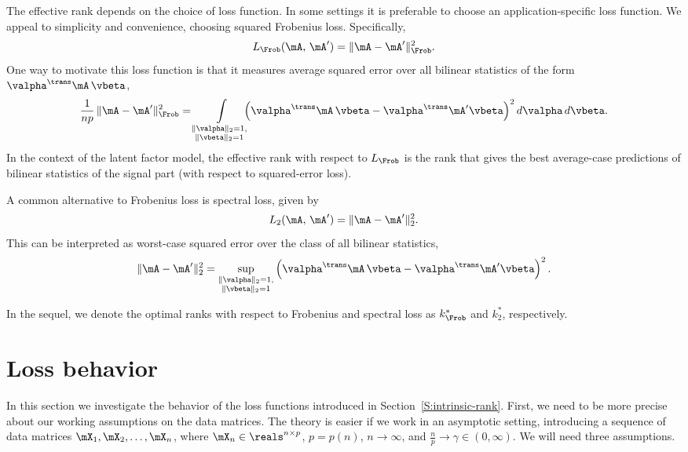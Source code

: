 The effective rank depends on the choice of loss function.  In some settings it is preferable to choose an application-specific loss function.  We appeal to simplicity and convenience, choosing squared Frobenius loss.  Specifically,
\[
    L_\Frob ( \mA, \, \mA' )
        = \| \mA - \mA' \|_\Frob^2.
\]
One way to motivate this loss function is that it measures average squared error over all bilinear statistics of the form 
$\valpha^\trans \mA \, \vbeta$,
\[
    \frac{1}{np} \,
    \| \mA - \mA' \|_\Frob^2
    =
    \int\limits_{ \substack{ \| \valpha \|_2 = 1, \\
                             \| \vbeta \|_2  = 1 } }
        \!\!\!\!
        \left(
            \valpha^\trans \mA \, \vbeta
            -
            \valpha^\trans \mA' \vbeta
        \right)^2
        d\valpha \,
        d\vbeta.
\]
In the context of the latent factor model, the effective rank with respect
to $L_\Frob$ is the rank that gives the best average-case predictions of 
bilinear statistics of the signal part (with respect to squared-error loss). 

A common alternative to Frobenius loss is spectral loss, given by
\[
    L_2 ( \mA, \, \mA' )
        = \| \mA - \mA' \|_2^2.
\]
This can be interpreted as worst-case squared error over the class of all 
bilinear statistics,
\[
    \| \mA - \mA' \|_2^2
        =
            \sup_{ \substack{ \| \valpha \|_2 = 1, \\
                              \| \vbeta \|_2  = 1 } }
                \left(
                    \valpha^\trans \mA \, \vbeta
                    -
                    \valpha^\trans \mA' \vbeta
                \right)^2.
\]

In the sequel, we denote the optimal ranks with respect to Frobenius and
spectral loss as $k^\ast_\Frob$ and $k^\ast_2$, respectively.


\section{Loss behavior}\label{S:loss-behavior}

In this section we investigate the behavior of the loss functions introduced
in Section~\ref{S:intrinsic-rank}.  First, we need to be more precise about
our working assumptions on the data matrices.  The theory is easier if we
work in an asymptotic setting, introducing a sequence of data matrices
$\mX_1, \mX_2, \ldots, \mX_n$, where $\mX_n \in \reals^{n \times p}$, $p = p(n)$, $n \to \infty$, and $\frac{n}{p} \to \gamma \in (0,\infty)$.  We
will need three assumptions.

